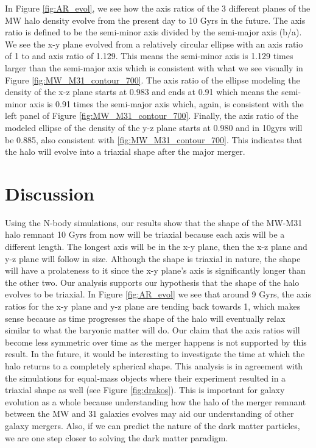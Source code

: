 \documentclass[linenumbers, twocolumn]{aastex631}
\begin{document}
In Figure \ref{fig:AR_evol}, we see how the axis ratios of the 3 different planes of the MW halo density evolve from the present day to 10 Gyrs in the future. The axis ratio is defined to be the semi-minor axis divided by the semi-major axis (b/a). We see the x-y plane evolved from a relatively circular ellipse with an axis ratio of 1 to and axis ratio of 1.129. This means the semi-minor axis is 1.129 times larger than the semi-major axis which is consistent with what we see visually in Figure \ref{fig:MW_M31_contour_700}. The axis ratio of the ellipse modeling the density of the x-z plane starts at 0.983 and ends at 0.91 which means the semi-minor axis is 0.91 times the semi-major axis which, again, is consistent with the left panel of Figure \ref{fig:MW_M31_contour_700}. Finally, the axis ratio of the modeled ellipse of the density of the y-z plane starts at 0.980 and in 10gyrs will be 0.885, also consistent with \ref{fig:MW_M31_contour_700}. This indicates that the halo will evolve into a triaxial shape after the major merger.

\section{Discussion}
Using the N-body simulations, our results show that the shape of the MW-M31 halo remnant 10 Gyrs from now will be triaxial because each axis will be a different length. The longest axis will be in the x-y plane, then the x-z plane and y-z plane will follow in size. Although the shape is triaxial in nature, the shape will have a prolateness to it since the x-y plane's axis is significantly longer than the other two.
Our analysis supports our hypothesis that the shape of the halo evolves to be triaxial. In Figure \ref{fig:AR_evol} we see that around 9 Gyrs, the axis ratios for the x-y plane and y-z plane are tending back towards 1, which makes sense because as time progresses the shape of the halo will eventually relax similar to what the baryonic matter will do. Our claim that the axis ratios will become less symmetric over time as the merger happens is not supported by this result. In the future, it would be interesting to investigate the time at which the halo returns to a completely spherical shape.
This analysis is in agreement with the \cite{2019drakos} simulations for equal-mass objects where their experiment resulted in a triaxial shape as well (see Figure \ref{fig:drakos}).
This is important for galaxy evolution as a whole because understanding how the halo of the merger remnant between the MW and 31 galaxies evolves may aid our understanding of other galaxy mergers. Also, if we can predict the nature of the dark matter particles, we are one step closer to solving the dark matter paradigm.
\end{document}
